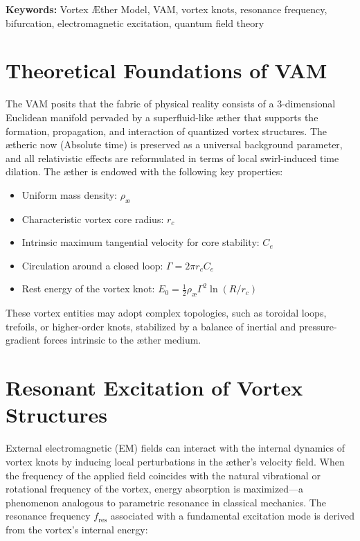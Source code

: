 \documentclass[a4paper, aps,preprint,superscriptaddress, 12pt]{revtex4}
\begin{document}
        \vspace{1cm}
        \textbf{Keywords:} Vortex Æther Model, VAM, vortex knots, resonance frequency, bifurcation, electromagnetic excitation, quantum field theory
\maketitle


\section{Theoretical Foundations of VAM}

The VAM posits that the fabric of physical reality consists of a 3-dimensional Euclidean manifold pervaded by a superfluid-like \ae{}ther that supports the formation, propagation, and interaction of quantized vortex structures. The ætheric now (Absolute time) is preserved as a universal background parameter, and all relativistic effects are reformulated in terms of local swirl-induced time dilation. The \ae{}ther is endowed with the following key properties:


\begin{itemize}
    \item Uniform mass density: $\rho_\text{\ae}$
    \item Characteristic vortex core radius: $r_c$
    \item Intrinsic maximum tangential velocity for core stability: $C_e$
    \item Circulation around a closed loop: $\Gamma = 2\pi r_c C_e$
    \item Rest energy of the vortex knot: $E_0 = \frac{1}{2} \rho_\text{\ae} \Gamma^2 \ln(R/r_c)$
\end{itemize}


These vortex entities may adopt complex topologies, such as toroidal loops, trefoils, or higher-order knots, stabilized by a balance of inertial and pressure-gradient forces intrinsic to the \ae{}ther medium.


\section{Resonant Excitation of Vortex Structures}

External electromagnetic (EM) fields can interact with the internal dynamics of vortex knots by inducing local perturbations in the \ae{}ther's velocity field. When the frequency of the applied field coincides with the natural vibrational or rotational frequency of the vortex, energy absorption is maximized—a phenomenon analogous to parametric resonance in classical mechanics. The resonance frequency $f_\text{res}$ associated with a fundamental excitation mode is derived from the vortex's internal energy:
\end{document}
